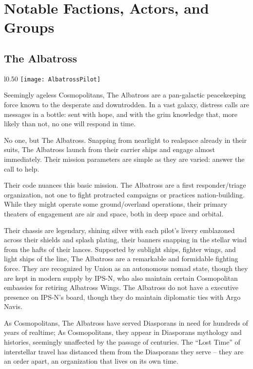 \newpage
\section{Notable Factions, Actors, and Groups}

\subsection{The Albatross}
\begin{wrapfigure}{l}{0.50\textwidth}
   \centering
   \texttt{[image: AlbatrossPilot]}
 \end{wrapfigure}

Seemingly ageless Cosmopolitans, The Albatross are a pan-galactic peacekeeping
force known to the desperate and downtrodden. In a vast galaxy, distress calls
are messages in a bottle: sent with hope, and with the grim knowledge that, more
likely than not, no one will respond in time.

No one, but The Albatross. Snapping from nearlight to realspace already in their
suits, The Albatross launch from their carrier ships and engage almost
immediately. Their mission parameters are simple as they are varied: answer the
call to help.

Their code nuances this basic mission. The Albatross are a first
responder/triage organization, not one to fight protracted campaigns or
practices nation-building. While they might operate some ground/overland
operations, their primary theaters of engagement are air and space, both in deep
space and orbital.

Their chassis are legendary, shining silver with each pilot’s livery emblazoned
across their shields and splash plating, their banners snapping in the stellar
wind from the hafts of their lances. Supported by sublight ships, fighter wings,
and light ships of the line, The Albatross are a remarkable and formidable
fighting force. They are recognized by Union as an autonomous nomad state,
though they are kept in modern supply by IPS-N, who also maintain certain
Cosmopolitan embassies for retiring Albatross Wings. The Albatross do not have a
executive presence on IPS-N’s board, though they do maintain diplomatic ties
with Argo Navis.

As Cosmopolitans, The Albatross have served Diasporans in need for hundreds of
years of realtime; As Cosmopolitans, they appear in Diasporans mythology and
histories, seemingly unaffected by the passage of centuries. The “Lost Time” of
interstellar travel has distanced them from the Diasporans they serve -- they
are an order apart, an organization that lives on its own time.

